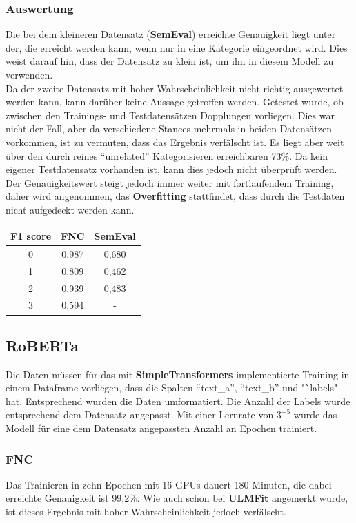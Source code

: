 \subsubsection*{Auswertung}
Die bei dem kleineren Datensatz (\textbf{SemEval}) erreichte Genauigkeit liegt unter der, die erreicht werden kann, wenn nur in eine Kategorie eingeordnet wird. Dies weist darauf hin, dass der Datensatz zu klein ist, um ihn in diesem Modell zu verwenden.\\
 Da der zweite Datensatz mit hoher Wahrscheinlichkeit nicht richtig ausgewertet werden kann, kann dar\"uber keine Aussage getroffen werden. Getestet wurde, ob zwischen den Trainings- und Testdatens\"atzen Dopplungen vorliegen. Dies war nicht der Fall, aber da verschiedene Stances mehrmals in beiden Datens\"atzen vorkommen, ist zu vermuten, dass das Ergebnis verf\"alscht ist. Es liegt aber weit \"uber den durch reines "`unrelated"' Kategorisieren erreichbaren 73\%. Da kein eigener Testdatensatz vorhanden ist, kann dies jedoch nicht \"uberpr\"uft werden. Der Genauigkeitswert steigt jedoch immer weiter mit fortlaufendem Training, daher wird angenommen, das \textbf{Overfitting} stattfindet, dass durch die Testdaten nicht aufgedeckt werden kann.
\begin{center}
\begin{tabular}{|c||c|c|}
\hline
F1 score & FNC & SemEval\\ 
\hline\hline
0 & 0,987 & 0,680\\
\hline
1 & 0,809 & 0,462\\ 
\hline
2 & 0,939 & 0,483\\
\hline
3 & 0,594 & -\\
\hline    
\end{tabular}
\end{center}

\subsection{RoBERTa}
Die Daten m\"ussen f\"ur das mit \textbf{SimpleTransformers} implementierte Training in einem Dataframe vorliegen, dass die Spalten "`text\_a"', "`text\_b"' und "`labels" hat. Entsprechend wurden die Daten umformatiert. Die Anzahl der Labels wurde entsprechend dem Datensatz angepasst. Mit einer Lernrate von $3^{-5}$ wurde das Modell f\"ur eine dem Datensatz angepassten Anzahl an Epochen trainiert.

\subsubsection*{FNC}
Das Trainieren in zehn Epochen mit 16 GPUs dauert 180 Minuten, die dabei erreichte Genauigkeit ist 99,2\%. Wie auch schon bei \textbf{ULMFit} angemerkt wurde, ist dieses Ergebnis mit hoher Wahrscheinlichkeit jedoch verf\"alscht.

